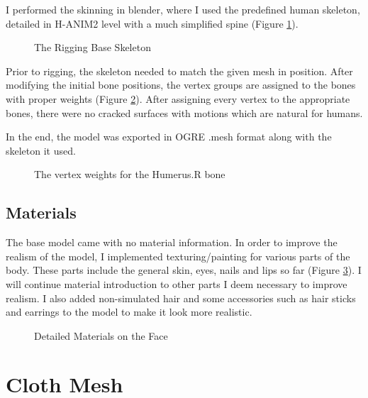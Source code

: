 I performed the skinning in blender, where I used the predefined human skeleton, detailed in H-ANIM2 level with a much simplified spine (Figure \ref{fig:rigging_skeleton}). 

\begin{figure}[h]
\centerline{}
\caption{The Rigging Base Skeleton}
\label{fig:rigging_skeleton}
\end{figure}

Prior to rigging, the skeleton needed to match the given mesh in position. After modifying the initial bone positions, the vertex groups are assigned to the bones with proper weights (Figure \ref{fig:weight_humerus_r}). After assigning every vertex to the appropriate bones, there were no cracked surfaces with motions which are natural for humans. 

In the end, the model was exported in OGRE .mesh format along with the skeleton it used.

\begin{figure}[h]
\centerline{}
\caption{The vertex weights for the Humerus.R bone}
\label{fig:weight_humerus_r}
\end{figure}

\subsection{Materials}

The base model came with no material information. In order to improve the realism of the model, I implemented texturing/painting for various parts of the body. These parts include the general skin, eyes, nails and lips so far (Figure \ref{fig:detailed_face}).  I will continue material introduction to other parts I deem necessary to improve realism. I also added non-simulated hair and some accessories such as hair sticks and earrings to the model to make it look more realistic.

\begin{figure}[h]
\centerline{}
\caption{Detailed Materials on the Face}
\label{fig:detailed_face}
\end{figure}

\section{Cloth Mesh}
\label{section_cloth_mesh}

